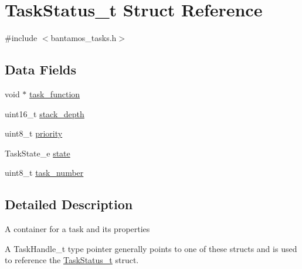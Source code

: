 \hypertarget{struct_task_status__t}{\section{Task\-Status\-\_\-t Struct Reference}
\label{struct_task_status__t}
}


{\ttfamily \#include $<$bantamos\-\_\-tasks.\-h$>$}

\subsection*{Data Fields}
\begin{DoxyCompactItemize}
\item 
void $\ast$ \hyperlink{struct_task_status__t_a27f8af792ccfae5edfbbfc732854ea24}{task\-\_\-function}
\item 
uint16\-\_\-t \hyperlink{struct_task_status__t_a871d318da2b64860c69302300b85674a}{stack\-\_\-depth}
\item 
uint8\-\_\-t \hyperlink{struct_task_status__t_a0ad043071ccc7a261d79a759dc9c6f0c}{priority}
\item 
Task\-State\-\_\-e \hyperlink{struct_task_status__t_a574eb235ee9dadcd5113f49f05b87a61}{state}
\item 
uint8\-\_\-t \hyperlink{struct_task_status__t_ae1ced017faebaf11cad29bdb7bef902b}{task\-\_\-number}
\end{DoxyCompactItemize}


\subsection{Detailed Description}
A container for a task and its properties

A Task\-Handle\-\_\-t type pointer generally points to one of these structs and is used to reference the \hyperlink{struct_task_status__t}{Task\-Status\-\_\-t} struct. 

